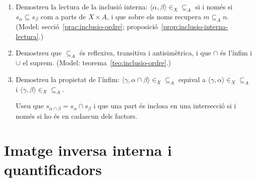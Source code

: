 \begin{enumerate}[resume]
  \item Demostreu la lectura de la inclusió interna: \(\langle\alpha,\beta\rangle\in_X{\subseteq_A}\) si i només si \(s_\alpha\subseteq s_\beta\) com a parts de \(X\times A\), i que sobre els noms recupera \(m\subseteq_A n\). (Model: secció~\ref{prac:inclusio-ordre}; proposició~\ref{prop:inclusio-interna-lectura}.)

  \item Demostreu que \(\subseteq_A\) és reflexiva, transitiva i antisimètrica, i que \(\cap\) és l'ínfim i \(\cup\) el suprem. (Model: teorema~\ref{teo:inclusio-ordre}.)

  \item Demostreu la propietat de l'ínfim: \(\langle\gamma,\alpha\cap\beta\rangle\in_X{\subseteq_A}\) equival a \(\langle\gamma,\alpha\rangle\in_X{\subseteq_A}\) i \(\langle\gamma,\beta\rangle\in_X{\subseteq_A}\). \begin{indicacio}Useu que \(s_{\alpha\cap\beta}=s_\alpha\cap s_\beta\) i que una part és inclosa en una intersecció si i només si ho és en cadascun dels factors.\end{indicacio}
\end{enumerate}

\section{Imatge inversa interna i quantificadors}

